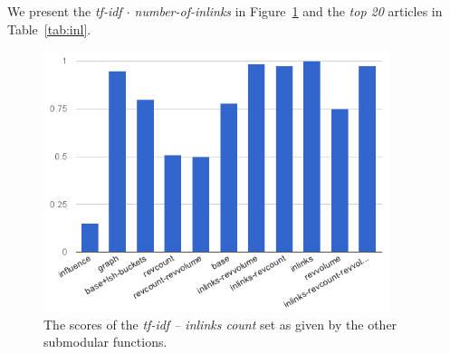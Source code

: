 We present the \emph{tf-idf \(\cdot\) number-of-inlinks} in
Figure~\ref{img:inl} and the \emph{top 20} articles in Table~\ref{tab:inl}.
\begin{figure}
  \centering
  \includegraphics[width=0.9\textwidth,natwidth=555,natheight=419]{images/inl.png}
  \caption{The scores of the \emph{tf-idf -- inlinks count} set as given by the
  other submodular functions.}
  \label{img:inl}
\end{figure}

